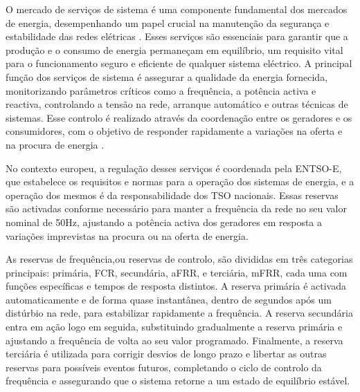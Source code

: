 
O mercado de serviços de sistema é uma componente fundamental dos mercados de energia, desempenhando um papel crucial na manutenção da segurança e estabilidade das redes elétricas \cite{dgegmss}. Esses serviços são essenciais para garantir que a produção e o consumo de energia permaneçam em equilíbrio, um requisito vital para o funcionamento seguro e eficiente de qualquer sistema eléctrico. A principal função dos serviços de sistema é assegurar a qualidade da energia fornecida, monitorizando parâmetros críticos como a frequência, a potência activa e reactiva, controlando a tensão na rede, arranque automático e outras técnicas de sistemas. Esse controlo é realizado através da coordenação entre os geradores e os consumidores, com o objetivo de responder rapidamente a variações na oferta e na procura de energia \cite{Rassid2017, Carneiro2016}.\par
No contexto europeu, a regulação desses serviços é coordenada pela \gls{ENTSO-E}, que estabelece os requisitos e normas para a operação dos sistemas de energia, e a operação dos mesmos é da responsabilidade dos \gls{TSO} nacionais. Essas reservas são activadas conforme necessário para manter a frequência da rede no seu valor nominal de 50Hz, ajustando a potência activa dos geradores em resposta a variações imprevistas na procura ou na oferta de energia.\par
As reservas de frequência,ou reservas de controlo, são divididas em três categorias principais: primária, \gls{FCR}, secundária, \gls{aFRR}, e terciária, \gls{mFRR}, cada uma com funções específicas e tempos de resposta distintos. A reserva primária é activada automaticamente e de forma quase instantânea, dentro de segundos após um distúrbio na rede, para estabilizar rapidamente a frequência. A reserva secundária entra em ação logo em seguida, substituindo gradualmente a reserva primária e ajustando a frequência de volta ao seu valor programado. Finalmente, a reserva terciária é utilizada para corrigir desvios de longo prazo e libertar as outras reservas para possíveis eventos futuros, completando o ciclo de controlo da frequência e assegurando que o sistema retorne a um estado de equilíbrio estável.\par
